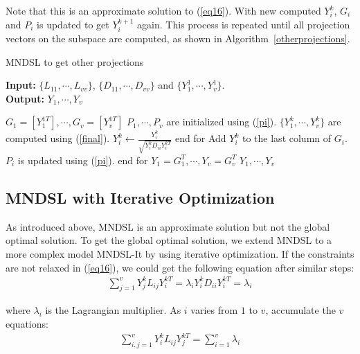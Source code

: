 \documentclass[journal]{IEEEtran}
\begin{document}
Note that this is an approximate solution to (\ref{eq16}). 
With new computed $Y_i^k$, $G_i$ and $P_i$ is updated to get $Y_i^{k+1}$ again. 
This process is repeated until all projection vectors on the subspace are computed, as shown in Algorithm~\ref{otherprojections}. 
\begin{algorithm}[t]
\caption{MNDSL to get other projections} 
\label{otherprojections}
\hspace*{0.02in} {\bf Input:}
$\{L_{11}, \cdots, L_{vv}\}$, $\{D_{11}, \cdots, D_{vv}\}$ and $\{Y_1^1, \cdots, Y_v^1\}$. \\
\hspace*{0.02in} {\bf Output:} 
$Y_1, \cdots, Y_v$
\begin{algorithmic}[1]
\State $G_1=[Y_1^{1T}], \cdots, G_v=[Y_v^{1T}]$
\State $P_1, \cdots, P_v$ are initialized using (\ref{pi}).
\State $\{Y_1^{k}, \cdots, Y_v^{k}\}$ are computed using (\ref{final}).
\State $Y_i^k \gets \frac{Y_i^k}{\sqrt{Y_i^k D_{ii} Y_i^{kT}}}$
\EndFor
\State end for
\State Add $Y_i^k$ to the last column of $G_i$.
\State $P_i$ is updated using (\ref{pi}).
\EndFor
\State end for
\State $Y_1=G_1^T, \cdots, Y_v=G_v^T$
\State \Return $Y_1, \cdots, Y_v$
\end{algorithmic}
\end{algorithm}


\subsection{MNDSL with Iterative Optimization}
As introduced above, MNDSL is an approximate solution but not the global optimal solution. 
To get the global optimal solution, we extend MNDSL to a more complex model MNDSL-It by using iterative optimization. 
If the constraints are not relaxed in (\ref{eq16}), we could get the following equation after similar steps: 
\begin{gather}
\sum_{j=1}^v Y_j^{k}{L_{ij}}Y_i^{kT}=
\lambda_i Y_i^k{D_{ii}} Y_i^{kT} = \lambda_i
\end{gather}

where $\lambda_i$ is the Lagrangian multiplier. 
As $i$ varies from $1$ to $v$, accumulate the $v$ equations: 
\begin{gather}
\sum_{i,j=1}^v Y_i^{k}{L_{ij}}Y_j^{kT}=\sum_{i=1}^v\lambda_i
\end{gather}
\end{document}
